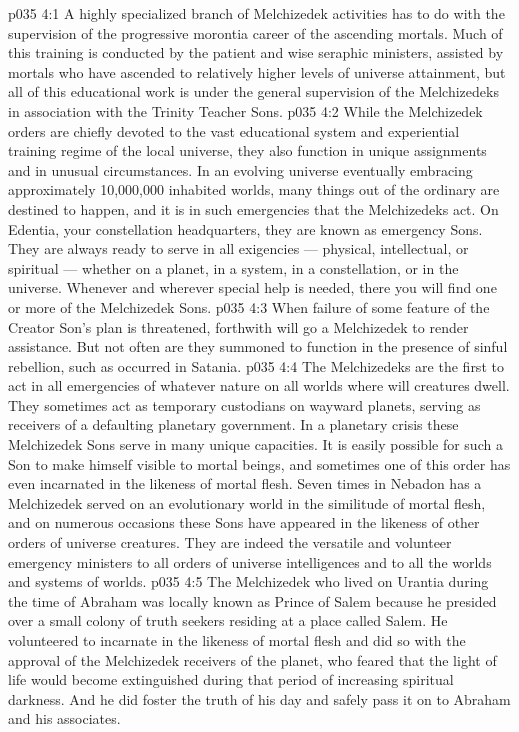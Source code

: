 \vs p035 4:1 A highly specialized branch of Melchizedek activities has to do with the supervision of the progressive morontia career of the ascending mortals. Much of this training is conducted by the patient and wise seraphic ministers, assisted by mortals who have ascended to relatively higher levels of universe attainment, but all of this educational work is under the general supervision of the Melchizedeks in association with the Trinity Teacher Sons.
\vs p035 4:2 \pc While the Melchizedek orders are chiefly devoted to the vast educational system and experiential training regime of the local universe, they also function in unique assignments and in unusual circumstances. In an evolving universe eventually embracing approximately 10,000,000 inhabited worlds, many things out of the ordinary are destined to happen, and it is in such emergencies that the Melchizedeks act. On Edentia, your constellation headquarters, they are known as emergency Sons. They are always ready to serve in all exigencies --- physical, intellectual, or spiritual --- whether on a planet, in a system, in a constellation, or in the universe. Whenever and wherever special help is needed, there you will find one or more of the Melchizedek Sons.
\vs p035 4:3 When failure of some feature of the Creator Son’s plan is threatened, forthwith will go a Melchizedek to render assistance. But not often are they summoned to function in the presence of sinful rebellion, such as occurred in Satania.
\vs p035 4:4 The Melchizedeks are the first to act in all emergencies of whatever nature on all worlds where will creatures dwell. They sometimes act as temporary custodians on wayward planets, serving as receivers of a defaulting planetary government. In a planetary crisis these Melchizedek Sons serve in many unique capacities. It is easily possible for such a Son to make himself visible to mortal beings, and sometimes one of this order has even incarnated in the likeness of mortal flesh. Seven times in Nebadon has a Melchizedek served on an evolutionary world in the similitude of mortal flesh, and on numerous occasions these Sons have appeared in the likeness of other orders of universe creatures. They are indeed the versatile and volunteer emergency ministers to all orders of universe intelligences and to all the worlds and systems of worlds.
\vs p035 4:5 \pc The Melchizedek who lived on Urantia during the time of Abraham was locally known as Prince of Salem because he presided over a small colony of truth seekers residing at a place called Salem. He volunteered to incarnate in the likeness of mortal flesh and did so with the approval of the Melchizedek receivers of the planet, who feared that the light of life would become extinguished during that period of increasing spiritual darkness. And he did foster the truth of his day and safely pass it on to Abraham and his associates.
